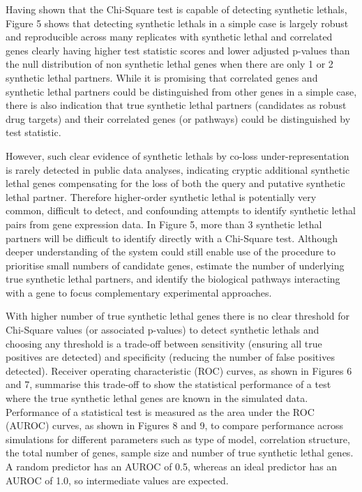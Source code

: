 Having shown that the Chi-Square test is capable of detecting \glspl{synthetic lethal}, Figure 5 shows that detecting \glspl{synthetic lethal} in a simple case is largely robust and reproducible across many replicates with \gls{synthetic lethal} and correlated genes clearly having higher test statistic scores and lower adjusted p-values than the null distribution of non synthetic lethal genes when there are only 1 or 2 \gls{synthetic lethal} partners.  While it is promising that correlated genes and \gls{synthetic lethal} partners could be distinguished from other genes in a simple case, there is also indication that true \gls{synthetic lethal} partners (candidates as robust drug targets) and their correlated genes (or pathways) could be distinguished by test statistic.

However, such clear evidence of \glspl{synthetic lethal} by co-loss under-representation is rarely detected in public data analyses, indicating cryptic additional \gls{synthetic lethal} genes compensating for the loss of both the query and putative \gls{synthetic lethal} partner.  Therefore higher-order \gls{synthetic lethal} is potentially very common, difficult to detect, and confounding attempts to identify \gls{synthetic lethal} pairs from \gls{gene expression} data.  In Figure 5, more than 3 \gls{synthetic lethal} partners will be difficult to identify directly with a Chi-Square test.  Although deeper understanding of the system could still enable use of the procedure to prioritise small numbers of candidate genes, estimate the number of underlying true \gls{synthetic lethal} partners, and identify the biological pathways interacting with a gene to focus complementary experimental approaches.

With higher number of true \gls{synthetic lethal} genes there is no clear threshold for Chi-Square values (or associated p-values) to detect \glspl{synthetic lethal} and choosing any threshold is a trade-off between sensitivity (ensuring all true positives are detected) and specificity (reducing the number of false positives detected).  Receiver operating characteristic (ROC) curves, as shown in Figures 6 and 7, summarise this trade-off to show the statistical performance of a test where the true \gls{synthetic lethal} genes are known in the simulated data.  Performance of a statistical test is measured as the area under the \gls{ROC} (AUROC) curves, as shown in Figures 8 and 9, to compare performance across simulations for different parameters such as type of model, correlation structure, the total number of genes, sample size and number of true \gls{synthetic lethal} genes.  A random predictor has an \gls{AUROC} of 0.5, whereas an ideal predictor has an \gls{AUROC} of 1.0, so intermediate values are expected.

